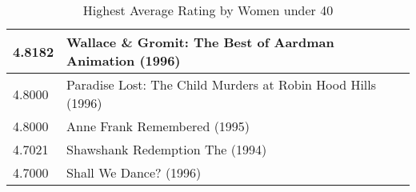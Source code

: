 \begin{flushleft}
\begin{table}[h]
\begin{tabular}{|ll|}
4.8182 & Wallace \& Gromit: The Best of Aardman Animation (1996)                         \\ \hline
4.8000 & Paradise Lost: The Child Murders at Robin Hood Hills (1996)                     \\ \hline
4.8000 & Anne Frank Remembered (1995)                                                    \\
4.7021 & Shawshank Redemption The (1994)                                                 \\ \hline
4.7000 & Shall We Dance? (1996)                                                          \\ \hline

\end{tabular}
\caption{Highest Average Rating by Women under 40}
\end{table}

\end{flushleft}




